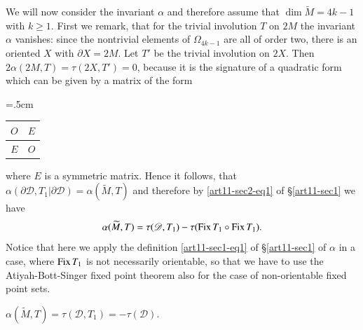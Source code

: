 We will now consider the invariant $\alpha$ and therefore assume that $\dim \widetilde{M}=4k-1$ with $k\geq 1$. First we remark, that for the trivial involution $T$ on $2M$ the invariant $\alpha$ vanishes: since the nontrivial elements of $\Omega_{4k-1}$ are all of order two, there is an oriented $X$ with $\partial X=2M$. Let $T'$ be the trivial involution on $2X$. Then $2\alpha(2M,T)=\tau(2X,T')=0$, because it is the signature of a quadratic form which can be given by a matrix of the form
\begin{center}
\tabcolsep=.5cm
\renewcommand{\arraystretch}{2}
\begin{tabular}{|c|c|}
\hline
$O$ & $E$\\
\hline
$E$ & $O$\\
\hline
\end{tabular}
\end{center}
where $E$ is a symmetric matrix. Hence it follows, that $\alpha(\partial \mathscr{D},T_{1}|\partial \mathscr{D})=\alpha(\widetilde{M},T)$ and therefore by \eqref{art11-sec2-eq1} of \S\ref{art11-sec1} we have
\begin{equation}
\alpha(\widetilde{M},T)=\tau(\mathscr{D},T_{1})-\tau(\operatorname{\mathrm{Fix}} T_{1}\circ \operatorname{\mathrm{Fix}} T_{1}).\label{art11-sec2-eq5}
\end{equation}
Notice that here we apply the definition \eqref{art11-sec1-eq1} of \S\ref{art11-sec1} of $\alpha$ in a case, where $\operatorname{\mathrm{Fix}} T_{1}$ is not necessarily orientable, so that we have to use the Atiyah-Bott-Singer fixed point theorem also for the case of non-orientable fixed point sets.

\begin{prop*}
$\alpha(\widetilde{M},T)=\tau(\mathscr{D},T_{1})=-\tau(\mathscr{D})$.
\end{prop*}


